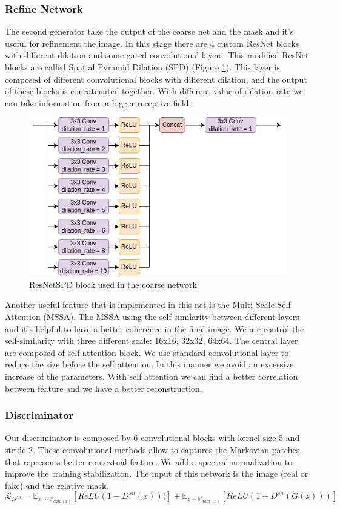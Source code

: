 \documentclass[10pt,twocolumn,letterpaper]{article}
\begin{document}
\subsubsection{Refine Network}
The second generator take the output of the coarse net and the mask and it's useful for refinement the image.
In this stage there are 4 custom ResNet blocks with different dilation and some gated convolutional layers.
This modified ResNet blocks are called Spatial Pyramid Dilation (SPD) (Figure \ref{fig:rnspd}). This layer is composed of different convolutional blocks with different dilation, and the output of these blocks is concatenated together. With different value of dilation rate we can take information from a bigger receptive field.
\begin{figure}
  \includegraphics[width=1\linewidth]{img/ResNetSPD.jpg}
  \caption{ResNetSPD block used in the coarse network}
  \label{fig:rnspd}
\end{figure}
Another useful feature that is implemented in this net is the Multi Scale Self Attention (MSSA). The MSSA using the self-similarity between different layers and it's helpful to have a better coherence in the final image. We are control the self-similarity with three different scale: 16x16, 32x32, 64x64.
The central layer are composed of self attention block. We use standard convolutional layer to reduce the size before the self attention. In this manner we avoid an excessive increase of the parameters. With self attention we can find a better correlation between feature and we have a better reconstruction.
\subsubsection{Discriminator}
Our discriminator is composed by 6 convolutional blocks with kernel size 5 and stride 2.
These convolutional methods allow to captures the Markovian patches that represents better contextual feature\cite{li2016precomputed}.
We add a spectral normalization to improve the training stabilization\cite{miyato2018spectral}.
The input of this network is the image (real or fake) and the relative mask. 
\begin{dmath}
        \mathcal{L}_{D^{sn}}= \mathbb{E}_{x\sim \mathbb{P}_{data(x)}} \left [ ReLU(1-D^{sn}(x))) \right ] + \mathbb{E}_{z\sim \mathbb{P}_{data(x)}} \left [ ReLU(1+D^{sn}(G(z)))\right ]
\end{dmath}
\end{document}

